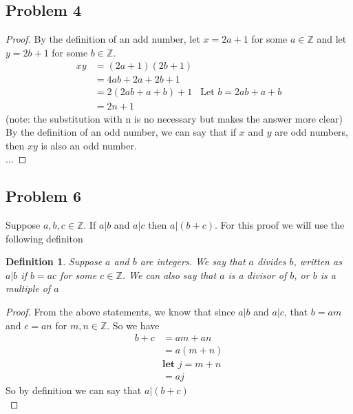 \documentclass[12pt]{article}
\newtheorem*{definition*}{Definition}
\newcommand{\Z}{\mathbb{Z}}
\begin{document}
\subsection*{Problem 4}
\begin{proof}
By the definition of an add number, let $x = 2a + 1$ for some $a \in \Z$  and let $y = 2b + 1$ for some $b \in \Z$.
\begin{align*}
xy &= (2a + 1)(2b + 1)\\
&= 4ab + 2a + 2b + 1\\
&= 2(2ab + a + b) + 1
&\text{Let } b = 2ab + a + b\\
&= 2n + 1
\end{align*}
(note: the substitution with n is no necessary but makes the answer more clear)\\
By the definition of an odd number, we can say that if $x$ and $y$ are odd numbers, then $xy$ is also an odd number.\\

...
\end{proof}


\subsection*{Problem 6}
Suppose $a,b,c \in \Z$. If $a|b$ and $a|c$ then $a|(b+c)$. For this proof we will use the following definiton
\begin{definition*}
Suppose $a$ and $b$ are integers. We say that $a$ divides $b$, written as $a|b$ if $b = ac$ for some $c \in \Z$. We can also say that $a$ is a divisor of $b$, or $b$ is a multiple of $a$
\end{definition*}
\begin{proof}

From the above statements, we know that since $a|b$ and $a|c$, that $b = am$ and $c = an$ for $m,n \in \Z$. So we have
\begin{align*}
b + c &= am + an\\
&= a(m + n) \\
&\textbf{let } j = m + n\\
&= aj
\end{align*}
So by definition we can say that $a|(b+c)$\\
\end{proof}

\newpage
\end{document}
